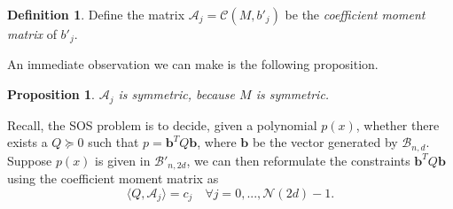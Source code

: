 \documentclass[12pt]{amsart}
\numberwithin{equation}{section}
\newtheorem{prop}[thm]{Proposition}
\theoremstyle{definition}
\newtheorem{definition}[thm]{Definition}
\numberwithin{thm}{section}
\begin{document}
\begin{definition}
Define the matrix $\mathcal{A}_j = \mathcal{C}(M, b'_j)$ be the \emph{coefficient moment matrix} of $b'_j$.
\end{definition}

An immediate observation we can make is the following proposition.
\begin{prop}
     $\mathcal{A}_j$ is symmetric, because $M$ is symmetric.
\end{prop}

\smallskip
Recall, the SOS problem is to decide, given a polynomial $p(x)$, 
whether there exists a $Q \succcurlyeq 0$ such that $p = \mathbf{b}^TQ \mathbf{b}$, where $\mathbf{b}$ be the vector generated by $\mathcal{B}_{n, d}$.
Suppose $p(x)$ is given in $\mathcal{B'}_{n, 2d}$, we can then reformulate the constraints $\mathbf{b}^TQ \mathbf{b}$ using the {coefficient moment matrix} as
\begin{equation}
     \langle Q, \mathcal{A}_j \rangle = c_j \quad \forall j = 0,..., \mathcal{N}(2d)- 1.
\end{equation} 
\end{document}
